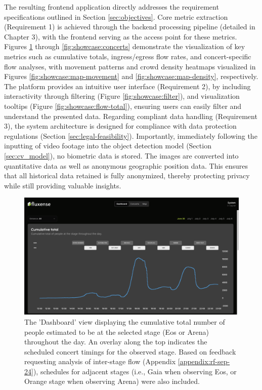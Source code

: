 The resulting frontend application directly addresses the requirement specifications outlined in Section \ref{sec:objectives}. Core metric extraction (Requirement 1) is achieved through the backend processing pipeline (detailed in Chapter 3), with the frontend serving as the access point for these metrics. Figures \ref{fig:showcase:dashboard} through \ref{fig:showcase:concerts} demonstrate the visualization of key metrics such as cumulative totals, ingress/egress flow rates, and concert-specific flow analyses, with movement patterns and crowd density heatmaps visualized in Figures \ref{fig:showcase:map-movement} and \ref{fig:showcase:map-density}, respectively. The platform provides an intuitive user interface (Requirement 2), by including interactivity through filtering (Figure \ref{fig:showcase:filter}), and visualization tooltips (Figure \ref{fig:showcase:flow-total}), ensuring users can easily filter and understand the presented data. Regarding compliant data handling (Requirement 3), the system architecture is designed for compliance with data protection regulations (Section \ref{sec:legal-feasibility}). Importantly, immediately following the inputting of video footage into the object detection model (Section \ref{sec:cv_model}), no biometric data is stored. The images are converted into quantitative data as well as anonymous geographic position data. This ensures that all historical data retained is fully anonymized, thereby protecting privacy while still providing valuable insights.


\begin{figure}[H]
  \centering
  \includegraphics[width=\textwidth]{Pictures/Misc/Frontend/cum_total.png}
  \caption{The 'Dashboard' view displaying the cumulative total number of people estimated to be at the selected stage (Eos or Arena) throughout the day. An overlay along the top indicates the scheduled concert timings for the observed stage. Based on feedback requesting analysis of inter-stage flow (Appendix \ref{appendix:rf-sep-24}), schedules for adjacent stages (i.e., Gaia when observing Eos, or Orange stage when observing Arena) were also included.}
  \label{fig:showcase:dashboard}

\end{figure}


